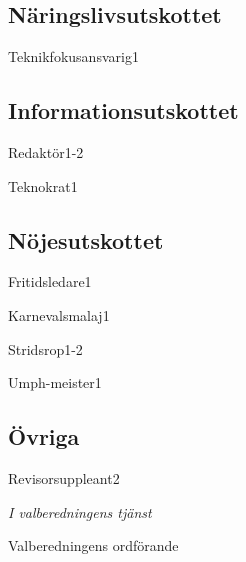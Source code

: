 \documentclass[../_main/handlingar.tex]{subfiles}
\begin{document}

\subsection*{Näringslivsutskottet}
\begin{vallista}
    \begin{post}{Teknikfokusansvarig}{1}
        \vakant
    \end{post}
\end{vallista}

\subsection*{Informationsutskottet}
\begin{vallista}
    \begin{post}{Redaktör}{1-2}
        \vakant
        \vakant
    \end{post}
    \begin{post}{Teknokrat}{1}
        \vakant
    \end{post}
\end{vallista}

\subsection*{Nöjesutskottet}
\begin{vallista}
    \begin{post}{Fritidsledare}{1}
        \vakant
    \end{post}
    \begin{post}{Karnevalsmalaj}{1}
        \vakant
    \end{post}
    \begin{post}{Stridsrop}{1-2}
        \vakant
        \vakant
    \end{post}
    \begin{post}{Umph-meister}{1}
        \vakant
    \end{post}
\end{vallista}

\subsection*{Övriga}
\begin{vallista}
    \begin{post}{Revisorsuppleant}{2}
        \vakant
        \vakant
    \end{post}
\end{vallista}

\begin{signatures}{1}
\emph{I valberedningens tjänst}
\signature{Christian Benson}{Valberedningens ordförande}
\end{signatures}
\end{document}
